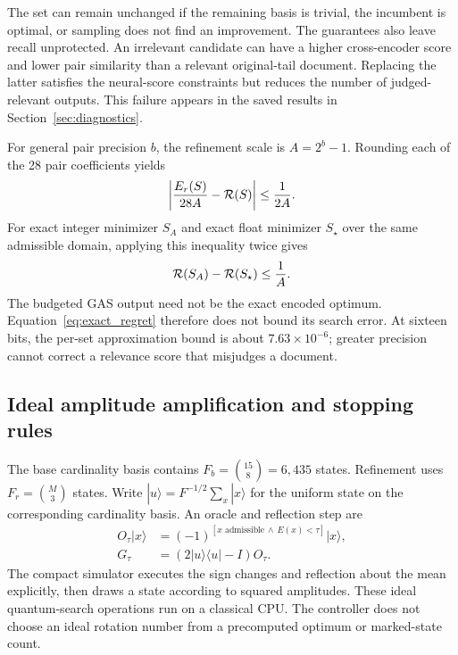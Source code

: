 The set can remain unchanged if the remaining basis is trivial, the incumbent is optimal, or sampling does not find an improvement. The guarantees also leave recall unprotected. An irrelevant candidate can have a higher cross-encoder score and lower pair similarity than a relevant original-tail document. Replacing the latter satisfies the neural-score constraints but reduces the number of judged-relevant outputs. This failure appears in the saved results in Section~\ref{sec:diagnostics}.

For general pair precision $b$, the refinement scale is $A=2^b-1$. Rounding each of the 28 pair coefficients yields
\begin{equation}
\left|\frac{E_r(S)}{28A}-\mathcal{R}(S)\right|\leq\frac{1}{2A}.
\label{eq:refinement_bound}
\end{equation}
For exact integer minimizer $S_A$ and exact float minimizer $S_\star$ over the same admissible domain, applying this inequality twice gives
\begin{equation}
\mathcal{R}(S_A)-\mathcal{R}(S_\star)\leq\frac{1}{A}.
\label{eq:exact_regret}
\end{equation}
The budgeted GAS output need not be the exact encoded optimum. Equation~\eqref{eq:exact_regret} therefore does not bound its search error. At sixteen bits, the per-set approximation bound is about $7.63\times10^{-6}$; greater precision cannot correct a relevance score that misjudges a document.

\subsection{Ideal amplitude amplification and stopping rules}
The base cardinality basis contains $F_b=\binom{15}{8}=6{,}435$ states. Refinement uses $F_r=\binom{M}{3}$ states. Write $|u\rangle=F^{-1/2}\sum_x|x\rangle$ for the uniform state on the corresponding cardinality basis. An oracle and reflection step are
\begin{align}
O_\tau|x\rangle&=(-1)^{[x\text{ admissible}\,\land\,E(x)<\tau]}|x\rangle,\\
G_\tau&=(2|u\rangle\langle u|-I)O_\tau.
\label{eq:amplification}
\end{align}
The compact simulator executes the sign changes and reflection about the mean explicitly, then draws a state according to squared amplitudes. These ideal quantum-search operations run on a classical CPU. The controller does not choose an ideal rotation number from a precomputed optimum or marked-state count.

